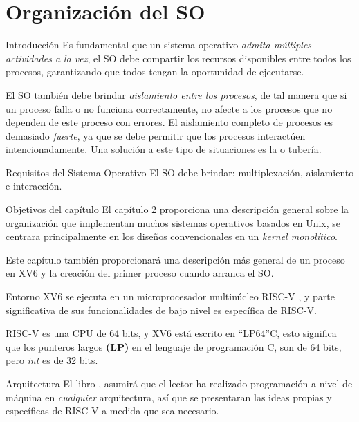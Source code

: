 \documentclass{libs/ufc_format}
\begin{document}
\section{Organización del SO}
\begin{frame}{Introducción}
  Es fundamental que un sistema operativo \emph{admita múltiples actividades a la vez}, el SO debe compartir los recursos disponibles entre todos los procesos, garantizando que todos tengan la oportunidad de ejecutarse.

  \vspace{0.2cm}

  El SO también debe brindar \emph{aislamiento entre los procesos}, de tal manera que si un proceso falla o no funciona correctamente, no afecte a los procesos que no dependen de este proceso con errores. El aislamiento completo de procesos es demasiado \textit{fuerte}, ya que se debe permitir que los procesos interactúen intencionadamente. Una solución a este tipo de situaciones es la \textit{} o tubería.

  \vspace{0.2cm}

  \begin{block}{Requisitos del Sistema Operativo}
    El SO debe brindar: multiplexación, aislamiento e interacción. \cite{xv6_book}
  \end{block}
\end{frame}
\begin{frame}{Objetivos del capítulo}
  El capítulo 2 proporciona una descripción general sobre la organización que implementan muchos sistemas operativos basados en Unix, se centrara principalmente en los diseños convencionales en un \emph{kernel monolítico}.

  \vspace{0.2cm}

  Este capítulo también proporcionará una descripción más general de un proceso en XV6 y la creación del primer proceso cuando arranca el SO.
\end{frame}
\begin{frame}{Entorno}
  XV6 se ejecuta en un microprocesador multinúcleo RISC-V \cite{xv6_book}, y parte significativa de sus funcionalidades de bajo nivel es específica de RISC-V.

  \vspace{0.3cm}

  RISC-V es una CPU de 64 bits, y XV6 está escrito en “LP64”C, esto significa que los punteros largos \textbf{(LP)} en el lenguaje de programación C, son de 64 bits, pero \textit{int} es de 32 bits.

  \begin{block}{Arquitectura}
    El libro \cite{xv6_book}, asumirá que el lector ha realizado programación a nivel de máquina en \emph{cualquier} arquitectura, así que se presentaran las ideas propias y específicas de RISC-V a medida que sea necesario.
  \end{block}
\end{frame}
\end{document}
